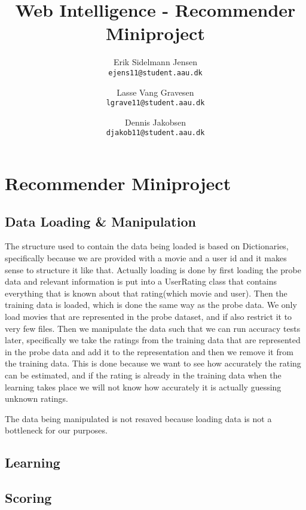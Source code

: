 

\author{
  Erik Sidelmann Jensen\\
  \texttt{ejens11@student.aau.dk}
  \and
  Lasse Vang Gravesen\\
  \texttt{lgrave11@student.aau.dk}
  \and
  Dennis Jakobsen\\
  \texttt{djakob11@student.aau.dk}  
}

\title{Web Intelligence - Recommender Miniproject}
\date{}


	\clearpage\maketitle
	\thispagestyle{empty}
	
	\chapter{Recommender Miniproject}
	\section{Data Loading \& Manipulation}
	The structure used to contain the data being loaded is based on Dictionaries, specifically because we are provided with a movie and a user id and it makes sense to structure it like that.
	Actually loading is done by first loading the probe data and relevant information is put into a UserRating class that contains everything that is known about that rating(which movie and user).
	Then the training data is loaded, which is done the same way as the probe data.
	We only load movies that are represented in the probe dataset, and if also restrict it to very few files. 
	Then we manipulate the data such that we can run accuracy tests later, specifically we take the ratings from the training data that are represented in the probe data and add it to the representation and then we remove it from the training data. This is done because we want to see how accurately the rating can be estimated, and if the rating is already in the training data when the learning takes place we will not know how accurately it is actually guessing unknown ratings.
	
	The data being manipulated is not resaved because loading data is not a bottleneck for our purposes.
	
	\section{Learning}
	
	\section{Scoring}
	


